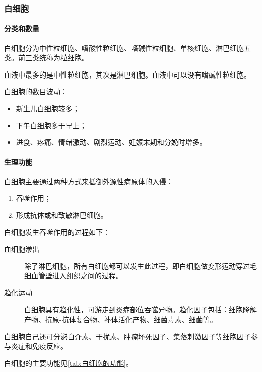 \subsubsection{白细胞}


\paragraph{分类和数量}

白细胞分为中性粒细胞、嗜酸性粒细胞、嗜碱性粒细胞、单核细胞、淋巴细胞五类。前三类统称为粒细胞。

血液中最多的是中性粒细胞，其次是淋巴细胞。血液中可以没有嗜碱性粒细胞。

白细胞的数目波动：

\begin{itemize}
	\item 新生儿白细胞较多；
	\item 下午白细胞多于早上；
	\item 进食、疼痛、情绪激动、剧烈运动、妊娠末期和分娩时增多。
\end{itemize}

\paragraph{生理功能}

白细胞主要通过两种方式来抵御外源性病原体的入侵：
\begin{enumerate}
	\item 吞噬作用；
	\item 形成抗体或和致敏淋巴细胞。
\end{enumerate}

白细胞发生吞噬作用的过程如下：

\begin{description}
	\item[血细胞渗出] 除了淋巴细胞，所有白细胞都可以发生此过程，即白细胞做变形运动穿过毛细血管壁进入组织之间的过程。
	\item[趋化运动] 白细胞具有趋化性，可游走到炎症部位吞噬异物。趋化因子包括：细胞降解产物、抗原-抗体复合物、补体活化产物、细菌毒素、细菌等。
\end{description}

白细胞自己还可分泌白介素、干扰素、肿瘤坏死因子、集落刺激因子等细胞因子参与炎症和免疫反应。

白细胞的主要功能见\autoref{tab:白细胞的功能}。

